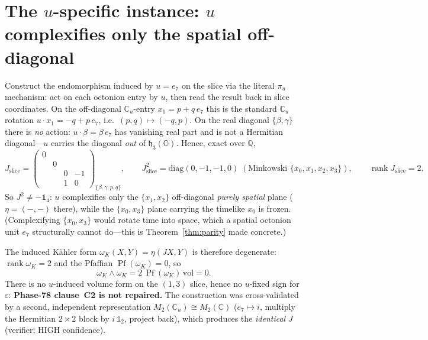 \documentclass[11pt]{article}
\newcommand{\Q}{\mathbb{Q}}
\newcommand{\OO}{\mathbb{O}}
\newcommand{\Cu}{\mathbb{C}_u}
\newcommand{\hh}{\mathfrak{h}}
\newcommand{\id}{\mathbb{1}}
\DeclareMathOperator{\Pf}{Pf}
\DeclareMathOperator{\rank}{rank}
\theoremstyle{plain}\newtheorem{theorem}{Theorem}
\theoremstyle{plain}\newtheorem{proposition}{Proposition}
\theoremstyle{plain}\newtheorem{corollary}{Corollary}
\theoremstyle{definition}\newtheorem{remark}{Remark}
\begin{document}
\section{The $u$-specific instance: $u$ complexifies only the spatial off-diagonal}
Construct the endomorphism induced by $u=e_7$ on the slice via the literal $\pi_u$
mechanism: act on each octonion entry by $u$, then read the result back in slice
coordinates. On the off-diagonal $\Cu$-entry $x_1=p+q\,e_7$ this is the standard
$\Cu$ rotation $u\cdot x_1=-q+p\,e_7$, i.e.\ $(p,q)\mapsto(-q,p)$. On the real diagonal
$\{\beta,\gamma\}$ there is \emph{no} action: $u\cdot\beta=\beta\,e_7$ has vanishing
real part and is not a Hermitian diagonal---$u$ carries the diagonal \emph{out} of
$\hh_3(\OO)$. Hence, exact over $\Q$,
\[
J_{\text{slice}}=\begin{pmatrix}0&&&\\&0&&\\&&0&-1\\&&1&0\end{pmatrix}_{\{\beta,\gamma,p,q\}},
\qquad
J_{\text{slice}}^2=\mathrm{diag}(0,-1,-1,0)\;(\text{Minkowski }\{x_0,x_1,x_2,x_3\}),
\qquad \rank J_{\text{slice}}=2 .
\]
So $J^2\neq-\id_4$: $u$ complexifies only the $\{x_1,x_2\}$ off-diagonal \emph{purely
spatial} plane ($\eta=(-,-)$ there), while the $\{x_0,x_3\}$ plane carrying the timelike
$x_0$ is frozen. (Complexifying $\{x_0,x_3\}$ would rotate time into space, which a spatial
octonion unit $e_7$ structurally cannot do---this is Theorem~\ref{thm:parity} made concrete.)

The induced K\"ahler form $\omega_K(X,Y)=\eta(JX,Y)$ is therefore degenerate:
$\rank\omega_K=2$ and the Pfaffian $\Pf(\omega_K)=0$, so
\[
\omega_K\wedge\omega_K=2\,\Pf(\omega_K)\,\mathrm{vol}=0 .
\]
There is no $u$-induced volume form on the $(1,3)$ slice, hence no $u$-fixed sign for
$\varepsilon$: \textbf{Phase-78 clause~C2 is not repaired.} The construction was
cross-validated by a second, independent representation $M_2(\Cu)\cong M_2(\mathbb{C})$
($e_7\mapsto i$, multiply the Hermitian $2\times2$ block by $i\,\id_2$, project back),
which produces the \emph{identical} $J$ (verifier; HIGH confidence).

\end{document}
